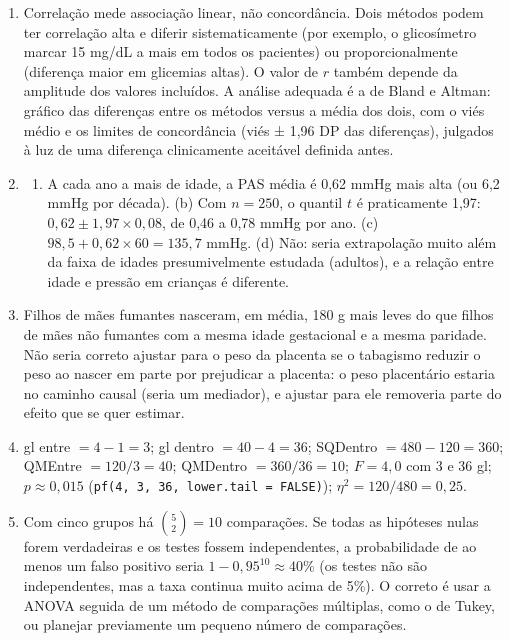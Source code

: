 \documentclass[
]{book}
\providecommand{\tightlist}{%
  \setlength{\itemsep}{0pt}\setlength{\parskip}{0pt}}
\begin{document}
\begin{enumerate}
\begin{verbatim}
## (Intercept)           x 
##         2.2         0.6
\end{verbatim}

\begin{verbatim}
## [1] 0.6
\end{verbatim}
\item
  Correlação mede associação linear, não concordância. Dois métodos podem ter correlação alta e diferir sistematicamente (por exemplo, o glicosímetro marcar 15 mg/dL a mais em todos os pacientes) ou proporcionalmente (diferença maior em glicemias altas). O valor de \(r\) também depende da amplitude dos valores incluídos. A análise adequada é a de Bland e Altman: gráfico das diferenças entre os métodos versus a média dos dois, com o viés médio e os limites de concordância (viés ± 1,96 DP das diferenças), julgados à luz de uma diferença clinicamente aceitável definida antes.
\item
  \begin{enumerate}
  \def\labelenumii{(\alph{enumii})}
  \tightlist
  \item
    A cada ano a mais de idade, a PAS média é 0,62 mmHg mais alta (ou 6,2 mmHg por década). (b) Com \(n = 250\), o quantil \(t\) é praticamente 1,97: \(0{,}62 \pm 1{,}97 \times 0{,}08\), de 0,46 a 0,78 mmHg por ano. (c) \(98{,}5 + 0{,}62 \times 60 = 135{,}7\) mmHg. (d) Não: seria extrapolação muito além da faixa de idades presumivelmente estudada (adultos), e a relação entre idade e pressão em crianças é diferente.
  \end{enumerate}
\item
  Filhos de mães fumantes nasceram, em média, 180 g mais leves do que filhos de mães não fumantes com a mesma idade gestacional e a mesma paridade. Não seria correto ajustar para o peso da placenta se o tabagismo reduzir o peso ao nascer em parte por prejudicar a placenta: o peso placentário estaria no caminho causal (seria um mediador), e ajustar para ele removeria parte do efeito que se quer estimar.
\item
  gl entre \(= 4 - 1 = 3\); gl dentro \(= 40 - 4 = 36\); SQDentro \(= 480 - 120 = 360\); QMEntre \(= 120/3 = 40\); QMDentro \(= 360/36 = 10\); \(F = 4{,}0\) com 3 e 36 gl; \(p \approx 0{,}015\) (\texttt{pf(4,\ 3,\ 36,\ lower.tail\ =\ FALSE)}); \(\eta^2 = 120/480 = 0{,}25\).
\item
  Com cinco grupos há \(\binom{5}{2} = 10\) comparações. Se todas as hipóteses nulas forem verdadeiras e os testes fossem independentes, a probabilidade de ao menos um falso positivo seria \(1 - 0{,}95^{10} \approx 40\%\) (os testes não são independentes, mas a taxa continua muito acima de 5\%). O correto é usar a ANOVA seguida de um método de comparações múltiplas, como o de Tukey, ou planejar previamente um pequeno número de comparações.

\end{enumerate}
\end{document}
